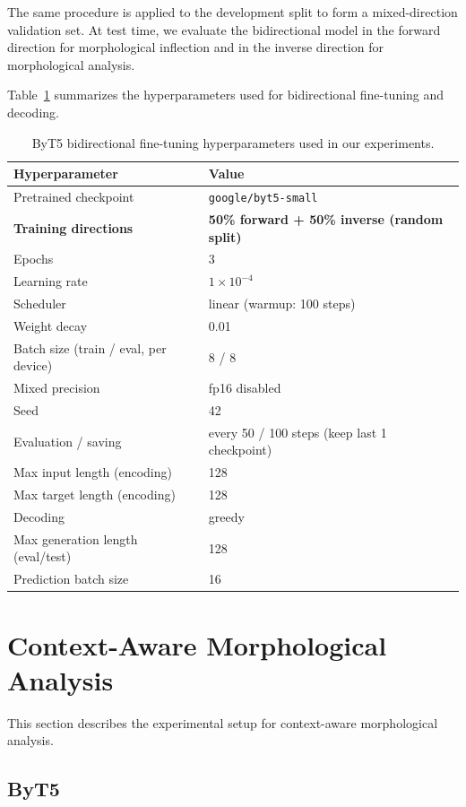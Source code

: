 The same procedure is applied to the development split to form a mixed-direction validation set. At test time, we evaluate the bidirectional model in the forward direction for morphological inflection and in the inverse direction for morphological analysis.

Table~\ref{tab:byt5_bidir_hyperparameters} summarizes the hyperparameters used for bidirectional fine-tuning and decoding.

\begin{table}[h]
\centering
\begin{tabular}{ll}
\toprule
Hyperparameter & Value \\
\midrule
Pretrained checkpoint & \texttt{google/byt5-small} \\
\textbf{Training directions} & \textbf{50\% forward + 50\% inverse (random split)} \\
Epochs & 3 \\
Learning rate & $1\times 10^{-4}$ \\
Scheduler & linear (warmup: 100 steps) \\
Weight decay & 0.01 \\
Batch size (train / eval, per device) & 8 / 8 \\
Mixed precision & fp16 disabled \\
Seed & 42 \\
Evaluation / saving & every 50 / 100 steps (keep last 1 checkpoint) \\
Max input length (encoding) & 128 \\
Max target length (encoding) & 128 \\
Decoding & greedy \\
Max generation length (eval/test) & 128 \\
Prediction batch size & 16 \\
\bottomrule
\end{tabular}
\caption{ByT5 bidirectional fine-tuning hyperparameters used in our experiments.}
\label{tab:byt5_bidir_hyperparameters}
\end{table}

\section{Context-Aware Morphological Analysis}
This section describes the experimental setup for context-aware morphological analysis.

\subsection{ByT5}
\label{sec:bidirectional_context}

